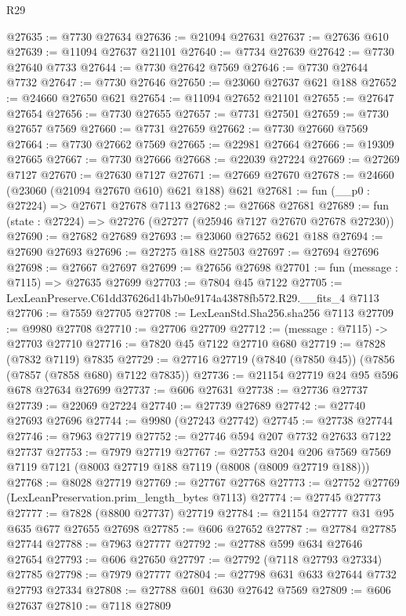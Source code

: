 \begin{lexlean}{R29}
\begin{coremodule}
@27635 := @7730 @27634
@27636 := @21094 @27631
@27637 := @27636 @610
@27639 := @11094 @27637 @21101
@27640 := @7734 @27639
@27642 := @7730 @27640 @7733
@27644 := @7730 @27642 @7569
@27646 := @7730 @27644 @7732
@27647 := @7730 @27646
@27650 := @23060 @27637 @621 @188
@27652 := @24660 @27650 @621
@27654 := @11094 @27652 @21101
@27655 := @27647 @27654
@27656 := @7730 @27655
@27657 := @7731 @27501
@27659 := @7730 @27657 @7569
@27660 := @7731 @27659
@27662 := @7730 @27660 @7569
@27664 := @7730 @27662 @7569
@27665 := @22981 @27664
@27666 := @19309 @27665
@27667 := @7730 @27666
@27668 := @22039 @27224
@27669 := @27269 @7127
@27670 := @27630 @7127
@27671 := @27669 @27670
@27678 := @24660 (@23060 (@21094 @27670 @610) @621 @188) @621
@27681 := fun (__p0 : @27224) => @27671 @27678 @7113
@27682 := @27668 @27681
@27689 := fun (state : @27224) => @27276 (@27277 (@25946 @7127 @27670 @27678 @27230))
@27690 := @27682 @27689
@27693 := @23060 @27652 @621 @188
@27694 := @27690 @27693
@27696 := @27275 @188 @27503
@27697 := @27694 @27696
@27698 := @27667 @27697
@27699 := @27656 @27698
@27701 := fun (message : @7115) => @27635 @27699
@27703 := @7804 @45 @7122
@27705 := LexLeanPreserve.C61dd37626d14b7b0e9174a43878fb572.R29.__fits_4 @7113
@27706 := @7559 @27705
@27708 := LexLeanStd.Sha256.sha256 @7113
@27709 := @9980 @27708
@27710 := @27706 @27709
@27712 := (message : @7115) -> @27703 @27710
@27716 := @7820 @45 @7122 @27710 @680
@27719 := @7828 (@7832 @7119) @7835
@27729 := @27716 @27719 (@7840 (@7850 @45)) (@7856 (@7857 (@7858 @680) @7122 @7835))
@27736 := @21154 @27719 @24 @95 @596 @678 @27634 @27699
@27737 := @606 @27631
@27738 := @27736 @27737
@27739 := @22069 @27224
@27740 := @27739 @27689
@27742 := @27740 @27693 @27696
@27744 := @9980 (@27243 @27742)
@27745 := @27738 @27744
@27746 := @7963 @27719
@27752 := @27746 @594 @207 @7732 @27633 @7122 @27737
@27753 := @7979 @27719
@27767 := @27753
    @204
    @206
    @7569
    @7569
    @7119
    @7121
    (@8003 @27719 @188 @7119 (@8008 (@8009 @27719 @188)))
@27768 := @8028 @27719
@27769 := @27767 @27768
@27773 := @27752 @27769 (LexLeanPreservation.prim_length_bytes @7113)
@27774 := @27745 @27773
@27777 := @7828 (@8800 @27737) @27719
@27784 := @21154 @27777 @31 @95 @635 @677 @27655 @27698
@27785 := @606 @27652
@27787 := @27784 @27785 @27744
@27788 := @7963 @27777
@27792 := @27788 @599 @634 @27646 @27654
@27793 := @606 @27650
@27797 := @27792 (@7118 @27793 @27334) @27785
@27798 := @7979 @27777
@27804 := @27798 @631 @633 @27644 @7732 @27793 @27334
@27808 := @27788 @601 @630 @27642 @7569
@27809 := @606 @27637
@27810 := @7118 @27809

\end{coremodule}
\end{lexlean}
